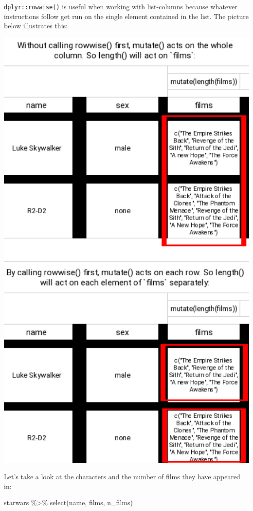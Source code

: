 \documentclass[
]{article}
\newenvironment{Shaded}{\begin{snugshade}}{\end{snugshade}}
\newcommand{\FunctionTok}[1]{\textcolor[rgb]{0.00,0.00,0.00}{#1}}
\newcommand{\NormalTok}[1]{#1}
\newcommand{\SpecialCharTok}[1]{\textcolor[rgb]{0.00,0.00,0.00}{#1}}
\begin{document}
\texttt{dplyr::rowwise()} is useful when working with list-columns because whatever instructions follow
get run on the single element contained in the list. The picture below illustrates this:

\includegraphics[width=5.5in]{assets/rowwise}

Let's take a look at the characters and the number of films they have appeared in:

\begin{Shaded}
\begin{Highlighting}[]
\NormalTok{starwars }\SpecialCharTok{\%\textgreater{}\%}
  \FunctionTok{select}\NormalTok{(name, films, n\_films)}
\end{Highlighting}
\end{Shaded}
\end{document}

